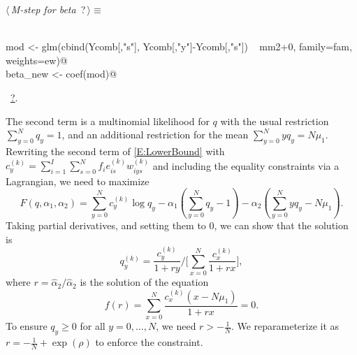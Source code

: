 \documentclass[reqno]{amsart}
\renewcommand{\NWtarget}[2]{\hypertarget{#1}{#2}}
\renewcommand{\NWlink}[2]{\hyperlink{#1}{#2}}
\begin{document}
\begin{flushleft} \small\label{scrap11}\raggedright\small
\NWtarget{nuweb?}{} $\langle\,${\itshape M-step for beta}\nobreak\ {\footnotesize {?}}$\,\rangle\equiv$
\vspace{-1ex}
\begin{list}{}{} \item
\mbox{}\verb@@\\
\mbox{}\verb@    mod <- glm(cbind(Ycomb[,"s"], Ycomb[,"y"]-Ycomb[,"s"]) ~ mm2+0, family=fam, weights=ew)@\\
\mbox{}\verb@    beta_new <- coef(mod)@\\
\mbox{}\verb@@{\NWsep}
\end{list}
\vspace{-1.5ex}
\footnotesize
\begin{list}{}{\setlength{\itemsep}{-\parsep}\setlength{\itemindent}{-\leftmargin}}
\item \NWtxtMacroRefIn\ \NWlink{nuweb?}{?}.

\item{}
\end{list}
\vspace{4ex}
\end{flushleft}
The second term is a multinomial likelihood for $q$ with the usual restriction  $\sum_{y=0}^N q_y=1$, and an additional restriction for the mean $\sum_{y=0}^{N}yq_y=N \mu_1$. Rewriting the second term of \eqref{E:LowerBound} with $c^{(k)}_y = \sum_{i=1}^I \sum_{s=0}^N f_i e_{is}^{(k)} w_{iys}^{(k)}$ and including the equality constraints via a Lagrangian, we need to maximize
\begin{equation*}
  F(q,\alpha_1,\alpha_2) = \sum_{y=0}^{N}c^{(k)}_y\log q_y - \alpha_1 (\sum_{y=0}^{N}q_y - 1) - \alpha_2 (\sum_{y=0}^{N}yq_y - N\mu_1).
\end{equation*}
Taking partial derivatives, and setting them to 0, we can show that the solution is
\begin{equation}\label{E:q_update}
  q^{(k)}_y = \frac{c^{(k)}_y}{1+r y} \Big/ \Big[ \sum_{x=0}^{N}\frac{c^{(k)}_x}{1+r x}\Big],
\end{equation}
where $r=\hat\alpha_2 / \hat\alpha_2$ is the solution of the equation
\begin{equation}\label{E:r_equation}
   f(r) = \sum_{x=0}^{N}\frac{c^{(k)}_x (x - N\mu_1)}{1+r x} = 0.
\end{equation}
To ensure $q_y\geq 0$ for all $y=0,\ldots,N$, we need $r> -\frac 1N$. We reparameterize it as $r=-\frac 1N+\exp(\rho)$ to enforce the constraint.
\end{document}
